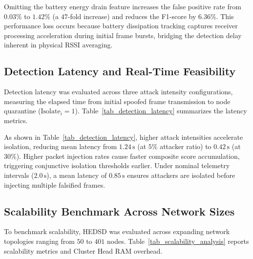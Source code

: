\documentclass[conference]{IEEEtran}
\begin{document}
\begin{enumerate}
Omitting the battery energy drain feature increases the false positive rate from $0.03\%$ to $1.42\%$ (a $47$-fold increase) and reduces the F1-score by $6.36\%$. This performance loss occurs because battery dissipation tracking captures receiver processing acceleration during initial frame bursts, bridging the detection delay inherent in physical RSSI averaging.

\subsection{Detection Latency and Real-Time Feasibility}
Detection latency was evaluated across three attack intensity configurations, measuring the elapsed time from initial spoofed frame transmission to node quarantine ($\text{Isolate}_i = 1$). Table~\ref{tab_detection_latency} summarizes the latency metrics.

\begin{table}[htbp]
\caption{Spoofing Detection Latency vs. Attack Intensity Level}
\label{tab_detection_latency}
\centering
\small
\renewcommand{\arraystretch}{1.15}
\end{table}

As shown in Table~\ref{tab_detection_latency}, higher attack intensities accelerate isolation, reducing mean latency from $1.24\,\text{s}$ (at $5\%$ attacker ratio) to $0.42\,\text{s}$ (at $30\%$). Higher packet injection rates cause faster composite score accumulation, triggering conjunctive isolation thresholds earlier. Under nominal telemetry intervals ($2.0\,\text{s}$), a mean latency of $0.85\,\text{s}$ ensures attackers are isolated before injecting multiple falsified frames.

\subsection{Scalability Benchmark Across Network Sizes}
To benchmark scalability, HEDSD was evaluated across expanding network topologies ranging from $50$ to $401$ nodes. Table~\ref{tab_scalability_analysis} reports scalability metrics and Cluster Head RAM overhead.


\end{enumerate}
\end{document}
